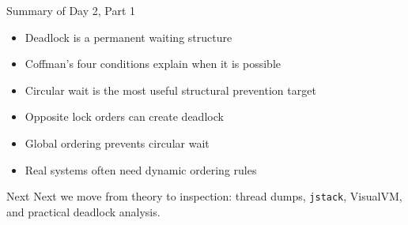\documentclass[aspectratio=169,11pt]{beamer}
\begin{document}
	
	\begin{frame}{Summary of Day 2, Part 1}
		\begin{itemize}
			\item Deadlock is a permanent waiting structure
			\item Coffman’s four conditions explain when it is possible
			\item Circular wait is the most useful structural prevention target
			\item Opposite lock orders can create deadlock
			\item Global ordering prevents circular wait
			\item Real systems often need dynamic ordering rules
		\end{itemize}
		
		\bigskip
		
		\begin{alertblock}{Next}
			Next we move from theory to inspection:
			thread dumps, \texttt{jstack}, VisualVM, and practical deadlock analysis.
		\end{alertblock}
	\end{frame}
	
\end{document}
